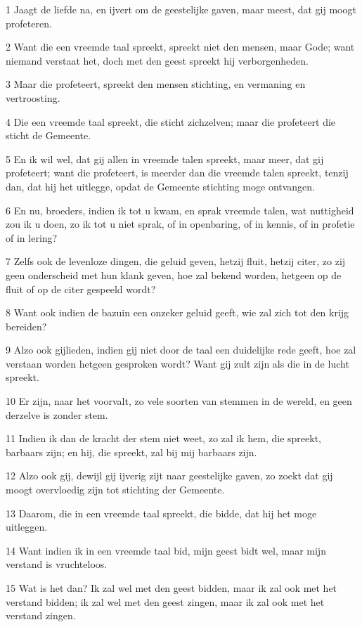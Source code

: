 \par 1 Jaagt de liefde na, en ijvert om de geestelijke gaven, maar meest, dat gij moogt profeteren.
\par 2 Want die een vreemde taal spreekt, spreekt niet den mensen, maar Gode; want niemand verstaat het, doch met den geest spreekt hij verborgenheden.
\par 3 Maar die profeteert, spreekt den mensen stichting, en vermaning en vertroosting.
\par 4 Die een vreemde taal spreekt, die sticht zichzelven; maar die profeteert die sticht de Gemeente.
\par 5 En ik wil wel, dat gij allen in vreemde talen spreekt, maar meer, dat gij profeteert; want die profeteert, is meerder dan die vreemde talen spreekt, tenzij dan, dat hij het uitlegge, opdat de Gemeente stichting moge ontvangen.
\par 6 En nu, broeders, indien ik tot u kwam, en sprak vreemde talen, wat nuttigheid zou ik u doen, zo ik tot u niet sprak, of in openbaring, of in kennis, of in profetie of in lering?
\par 7 Zelfs ook de levenloze dingen, die geluid geven, hetzij fluit, hetzij citer, zo zij geen onderscheid met hun klank geven, hoe zal bekend worden, hetgeen op de fluit of op de citer gespeeld wordt?
\par 8 Want ook indien de bazuin een onzeker geluid geeft, wie zal zich tot den krijg bereiden?
\par 9 Alzo ook gijlieden, indien gij niet door de taal een duidelijke rede geeft, hoe zal verstaan worden hetgeen gesproken wordt? Want gij zult zijn als die in de lucht spreekt.
\par 10 Er zijn, naar het voorvalt, zo vele soorten van stemmen in de wereld, en geen derzelve is zonder stem.
\par 11 Indien ik dan de kracht der stem niet weet, zo zal ik hem, die spreekt, barbaars zijn; en hij, die spreekt, zal bij mij barbaars zijn.
\par 12 Alzo ook gij, dewijl gij ijverig zijt naar geestelijke gaven, zo zoekt dat gij moogt overvloedig zijn tot stichting der Gemeente.
\par 13 Daarom, die in een vreemde taal spreekt, die bidde, dat hij het moge uitleggen.
\par 14 Want indien ik in een vreemde taal bid, mijn geest bidt wel, maar mijn verstand is vruchteloos.
\par 15 Wat is het dan? Ik zal wel met den geest bidden, maar ik zal ook met het verstand bidden; ik zal wel met den geest zingen, maar ik zal ook met het verstand zingen.
